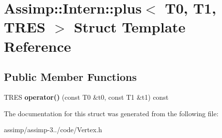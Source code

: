 \hypertarget{struct_assimp_1_1_intern_1_1plus}{\section{Assimp\+:\+:Intern\+:\+:plus$<$ T0, T1, T\+R\+E\+S $>$ Struct Template Reference}
\label{struct_assimp_1_1_intern_1_1plus}
}
\subsection*{Public Member Functions}
\begin{DoxyCompactItemize}
\item 
\hypertarget{struct_assimp_1_1_intern_1_1plus_a1bbdbfa3ddbf7ca16acf492ce2052fc7}{T\+R\+E\+S {\bfseries operator()} (const T0 \&t0, const T1 \&t1) const }\label{struct_assimp_1_1_intern_1_1plus_a1bbdbfa3ddbf7ca16acf492ce2052fc7}

\end{DoxyCompactItemize}


The documentation for this struct was generated from the following file\+:\begin{DoxyCompactItemize}
\item 
assimp/assimp-\/3../code/Vertex.\+h\end{DoxyCompactItemize}
